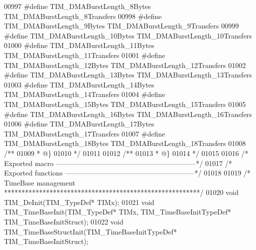 \begin{DoxyCode}
00997 \textcolor{preprocessor}{#}\textcolor{preprocessor}{define} \textcolor{preprocessor}{TIM\_DMABurstLength\_8Bytes}          TIM_DMABurstLength_8Transfers
00998 \textcolor{preprocessor}{#}\textcolor{preprocessor}{define} \textcolor{preprocessor}{TIM\_DMABurstLength\_9Bytes}          TIM_DMABurstLength_9Transfers
00999 \textcolor{preprocessor}{#}\textcolor{preprocessor}{define} \textcolor{preprocessor}{TIM\_DMABurstLength\_10Bytes}         TIM_DMABurstLength_10Transfers
01000 \textcolor{preprocessor}{#}\textcolor{preprocessor}{define} \textcolor{preprocessor}{TIM\_DMABurstLength\_11Bytes}         TIM_DMABurstLength_11Transfers
01001 \textcolor{preprocessor}{#}\textcolor{preprocessor}{define} \textcolor{preprocessor}{TIM\_DMABurstLength\_12Bytes}         TIM_DMABurstLength_12Transfers
01002 \textcolor{preprocessor}{#}\textcolor{preprocessor}{define} \textcolor{preprocessor}{TIM\_DMABurstLength\_13Bytes}         TIM_DMABurstLength_13Transfers
01003 \textcolor{preprocessor}{#}\textcolor{preprocessor}{define} \textcolor{preprocessor}{TIM\_DMABurstLength\_14Bytes}         TIM_DMABurstLength_14Transfers
01004 \textcolor{preprocessor}{#}\textcolor{preprocessor}{define} \textcolor{preprocessor}{TIM\_DMABurstLength\_15Bytes}         TIM_DMABurstLength_15Transfers
01005 \textcolor{preprocessor}{#}\textcolor{preprocessor}{define} \textcolor{preprocessor}{TIM\_DMABurstLength\_16Bytes}         TIM_DMABurstLength_16Transfers
01006 \textcolor{preprocessor}{#}\textcolor{preprocessor}{define} \textcolor{preprocessor}{TIM\_DMABurstLength\_17Bytes}         TIM_DMABurstLength_17Transfers
01007 \textcolor{preprocessor}{#}\textcolor{preprocessor}{define} \textcolor{preprocessor}{TIM\_DMABurstLength\_18Bytes}         TIM_DMABurstLength_18Transfers
01008 \textcolor{comment}{/**}
01009 \textcolor{comment}{  * @\}}
01010 \textcolor{comment}{  */}
01011 
01012 \textcolor{comment}{/**}
01013 \textcolor{comment}{  * @\}}
01014 \textcolor{comment}{  */}
01015 
01016 \textcolor{comment}{/* Exported macro ------------------------------------------------------------*/}
01017 \textcolor{comment}{/* Exported functions --------------------------------------------------------*/}
01018 
01019 \textcolor{comment}{/* TimeBase management ********************************************************/}
01020 \textcolor{keywordtype}{void} TIM_DeInit(TIM\_TypeDef* TIMx);
01021 \textcolor{keywordtype}{void} TIM_TimeBaseInit(TIM\_TypeDef* TIMx, TIM\_TimeBaseInitTypeDef* TIM\_TimeBaseInitStruct);
01022 \textcolor{keywordtype}{void} TIM_TimeBaseStructInit(TIM\_TimeBaseInitTypeDef* TIM\_TimeBaseInitStruct);

\end{DoxyCode}
